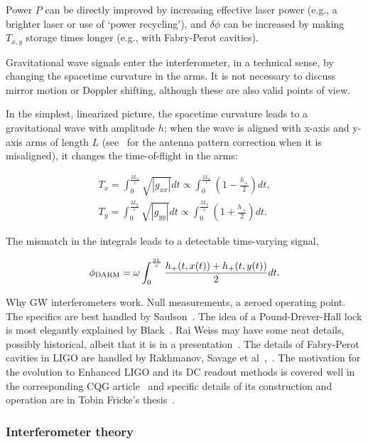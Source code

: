 Power $P$ can be directly improved by increasing effective laser power (e.g., a brighter laser or use of `power recycling'), and $\delta \phi$ can be increased by making $T_{x,y}$ storage times longer (e.g., with Fabry-Perot cavities).

Gravitational wave signals enter the interferometer, in a technical sense, by changing the spacetime curvature in the arms. It is not necessary to discuss mirror motion or Doppler shifting, although these are also valid points of view. 

In the simplest, linearized picture, the spacetime curvature leads to a gravitational wave with amplitude $h$; when the wave is aligned with x-axis and y-axis arms of length $L$ (see~\cite{Jaranowski1998} for the antenna pattern correction when it is misaligned), it changes the time-of-flight in the arms:

\begin{eqnarray}
T_x = \int_0^{\frac{2L_x}{c}} \sqrt{|g_{xx}|} dt \propto \int_0^{\frac{2L_x}{c}} \left(1 - \frac{h_+}{2} \right) dt, \\
T_y = \int_0^{\frac{2L_y}{c}} \sqrt{|g_{yy}|} dt \propto \int_0^{\frac{2L_y}{c}} \left(1 + \frac{h_+}{2} \right) dt.
\end{eqnarray}

\noindent The mismatch in the integrals leads to a detectable time-varying signal,

\begin{equation}
\phi_{\textup{DARM}} = \omega \int_0^{\frac{2L}{c}} \frac{h_+ (t, x(t)) + h_+ (t, y(t))}{2} dt.
\end{equation}  



            Why GW interferometers work. Null measurements, a zeroed operating point. The specifics are best handled by Saulson~\cite{Saulson}. The idea of a Pound-Drever-Hall lock is most elegantly explained by Black~\cite{PDHNotes}. Rai Weiss may have some neat details, possibly historical, albeit that it is in a presentation~\cite{LIGOWorks}. The details of Fabry-Perot cavities in LIGO are handled by Rakhmanov, Savage et al~\cite{ResonanceFP},~\cite{ResponsesFP}. The motivation for the evolution to Enhanced LIGO and its DC readout methods is covered well in the corresponding CQG article~\cite{Fricke2009} and specific details of its construction and operation are in Tobin Fricke's thesis~\cite{FrickeThesis}.

            \subsubsection{Interferometer theory}
            \label{interferometer_theory}
        
